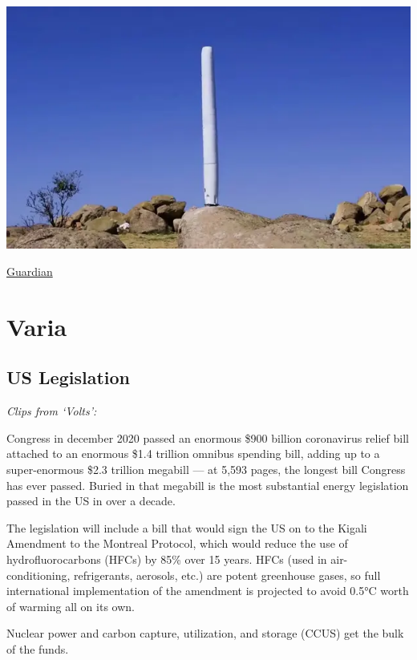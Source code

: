 \documentclass[
]{book}
\begin{document}
\includegraphics{fig/vortex_bladeless_3meter.png}

\href{https://www.theguardian.com/environment/2021/mar/16/good-vibrations-bladeless-turbines-could-bring-wind-power-to-your-home}{Guardian}

\hypertarget{varia}{%
\chapter{Varia}\label{varia}}

\hypertarget{us-legislation}{%
\section{US Legislation}\label{us-legislation}}

\emph{Clips from `Volts':}

Congress in december 2020 passed an enormous \$900 billion coronavirus relief bill attached to an enormous \$1.4 trillion omnibus spending bill, adding up to a super-enormous \$2.3 trillion megabill --- at 5,593 pages, the longest bill Congress has ever passed.
Buried in that megabill is the most substantial energy legislation passed in the US in over a decade.

The legislation will include a bill that would sign the US on to the Kigali Amendment to the Montreal Protocol, which would reduce the use of hydrofluorocarbons (HFCs) by 85\% over 15 years. HFCs (used in air-conditioning, refrigerants, aerosols, etc.) are potent greenhouse gases, so full international implementation of the amendment is projected to avoid 0.5°C worth of warming all on its own.

Nuclear power and carbon capture, utilization, and storage (CCUS) get the bulk of the funds.
\end{document}
